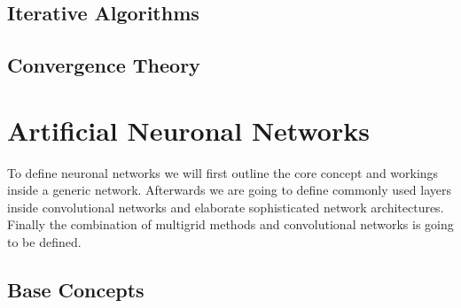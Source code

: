 \documentclass[a4paper,12pt,titlepage,enabledeprecatedfontcommands]{scrreprt}
\begin{document}
\section{Iterative Algorithms}
\section{Convergence Theory}
\chapter{Artificial Neuronal Networks}
To define neuronal networks we will first outline the core concept and workings inside a generic network. Afterwards we are going to define commonly used layers inside convolutional networks and elaborate sophisticated network architectures.
Finally the combination of multigrid methods and convolutional networks is going to be defined.
\section{Base Concepts}
\end{document}
